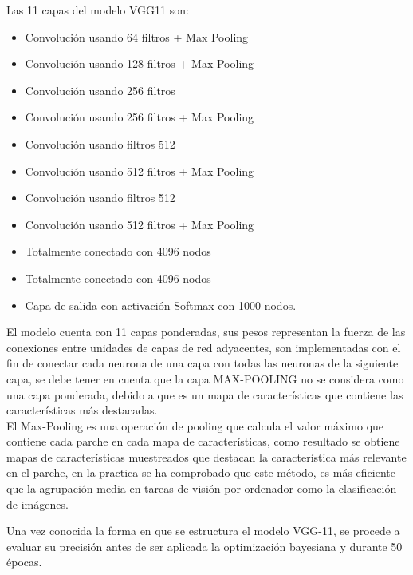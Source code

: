 			\newpage			
			Las 11 capas del modelo VGG11 son:
				\begin{itemize}
					\item Convolución usando 64 filtros + Max Pooling
					\item Convolución usando 128 filtros + Max Pooling
					\item Convolución usando 256 filtros
					\item Convolución usando 256 filtros + Max Pooling
					\item Convolución usando filtros 512
					\item Convolución usando 512 filtros + Max Pooling
					\item Convolución usando filtros 512
					\item Convolución usando 512 filtros + Max Pooling
					\item Totalmente conectado con 4096 nodos
					\item Totalmente conectado con 4096 nodos
					\item Capa de salida con activación Softmax con 1000 nodos.
				\end{itemize}
			
			El modelo cuenta con 11 capas ponderadas, sus pesos representan la fuerza de las conexiones entre unidades de capas de red adyacentes, son implementadas con el fin de conectar cada neurona de una capa con todas las neuronas de la siguiente capa, se debe tener en cuenta que la capa MAX-POOLING no se considera como una capa ponderada, debido a que es un mapa de características que contiene las características más destacadas.\\
			
			 El Max-Pooling es una operación de pooling que calcula el valor máximo que contiene cada parche en cada mapa de características, como resultado se obtiene mapas de características muestreados que destacan la característica más relevante en el parche, en la practica se ha comprobado que este método, es más eficiente que la agrupación media en tareas de visión por ordenador como la clasificación de imágenes.
			 
			\newpage
			Una vez conocida la forma en que se estructura el modelo VGG-11, se procede a evaluar su precisión antes de ser aplicada la optimización bayesiana y durante 50 épocas.
			
